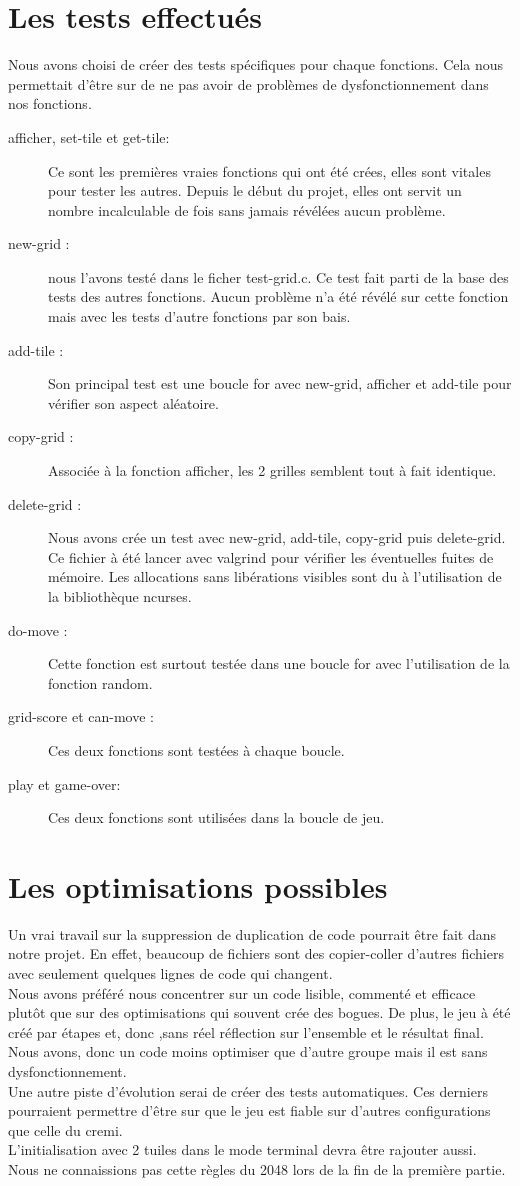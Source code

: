 \documentclass{report}
\begin{document}
\section{Les tests effectués}
Nous avons choisi de créer des tests spécifiques pour chaque fonctions. Cela nous permettait d'être sur de ne pas avoir de problèmes de dysfonctionnement dans nos fonctions.
\begin{description}
\item [afficher, set-tile et get-tile:] Ce sont les premières vraies fonctions qui ont été crées, elles sont vitales pour tester les autres. Depuis le début du projet, elles ont servit un nombre incalculable de fois sans jamais révélées aucun problème.
\item [new-grid :] nous l'avons testé dans le ficher test-grid.c. Ce test fait parti de la base des tests des autres fonctions. Aucun problème n'a été révélé sur cette fonction mais avec les tests d'autre fonctions par son bais.
\item [add-tile :] Son principal test est une boucle for avec new-grid, afficher et add-tile pour vérifier son aspect aléatoire.
\item [copy-grid :]Associée à la fonction afficher, les 2 grilles semblent tout à fait identique.
\item [delete-grid :] Nous avons crée un test avec new-grid, add-tile, copy-grid puis delete-grid. Ce fichier à été lancer avec valgrind pour vérifier les éventuelles fuites de mémoire. Les allocations sans libérations visibles sont du à l'utilisation de la bibliothèque ncurses.
\item [do-move :] Cette fonction est surtout testée dans une boucle for avec l'utilisation de la fonction random.
\item [grid-score et can-move :] Ces deux fonctions sont testées à chaque boucle.
\item [play et game-over:]Ces deux fonctions sont utilisées dans la boucle de jeu. 
\end{description}

\section{Les optimisations possibles}
Un vrai travail sur la suppression de duplication de code pourrait être fait dans notre projet. En effet, beaucoup de fichiers sont des copier-coller d'autres fichiers avec seulement quelques lignes de code qui changent.\\ Nous avons préféré nous concentrer sur un code lisible, commenté et efficace plutôt que sur des optimisations qui souvent crée des bogues. De plus, le jeu à été créé par étapes et, donc ,sans réel réflection sur l'ensemble et le résultat final. Nous avons, donc un code moins optimiser que d'autre groupe mais il est sans dysfonctionnement.\\
Une autre piste d'évolution serai de créer des tests automatiques. Ces derniers pourraient permettre d'être sur que le jeu est fiable sur d'autres configurations que celle du cremi.\\
L'initialisation avec 2 tuiles dans le mode terminal devra être rajouter aussi. Nous ne connaissions pas cette règles du 2048 lors de la fin de la première partie.
\end{document}
